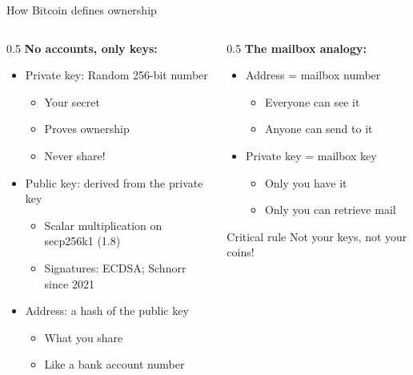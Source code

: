 \ifdefined\PRESENTATION\else\PassOptionsToClass{handout}{beamer}\fi\documentclass[aspectratio=169, lualatex]{beamer}
\begin{document}
\begin{frame}{How Bitcoin defines ownership}
	\begin{columns}[c]
		\begin{column}{0.5\textwidth}
			\textbf{No accounts, only keys:}
			\begin{itemize}
				\item Private key: Random 256-bit number
				      \begin{itemize}
					      \item Your secret
					      \item Proves ownership
					      \item Never share!
				      \end{itemize}
				\item Public key: derived from the private key
				      \begin{itemize}
					      \item Scalar multiplication on secp256k1 (1.8)
					      \item Signatures: ECDSA; Schnorr since 2021
				      \end{itemize}
				\item Address: a hash of the public key
				      \begin{itemize}
					      \item What you share
					      \item Like a bank account number
				      \end{itemize}
			\end{itemize}
		\end{column}
		\begin{column}{0.5\textwidth}
			\textbf{The mailbox analogy:}
			\begin{itemize}
				\item Address = mailbox number
				      \begin{itemize}
					      \item Everyone can see it
					      \item Anyone can send to it
				      \end{itemize}
				\item Private key = mailbox key
				      \begin{itemize}
					      \item Only you have it
					      \item Only you can retrieve mail
				      \end{itemize}
			\end{itemize}
			\begin{alertblock}{Critical rule}
				Not your keys, not your coins!
			\end{alertblock}
		\end{column}
	\end{columns}
\end{frame}
\end{document}
